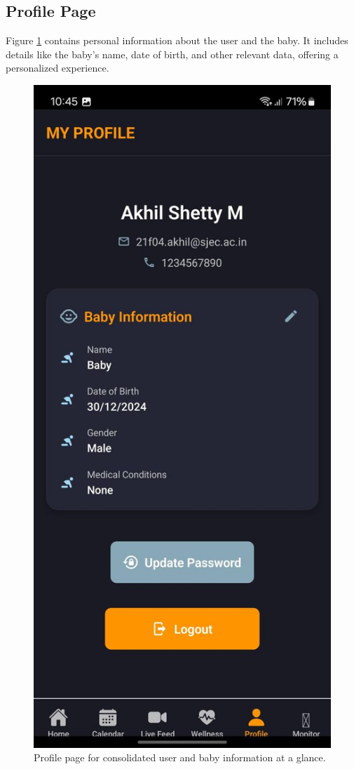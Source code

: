 \documentclass[12pt,a4paper]{report}
\begin{document}
\subsection{Profile Page}
Figure \ref{fig:profile} contains personal information about the user and the baby. It includes details like the baby’s name, date of birth, and other relevant data, offering a personalized experience.
\begin{figure}[htbp]
  \centering
  \includegraphics[scale=0.2]{./pic/profile.jpeg}
  \caption{Profile page for consolidated user and baby information at a glance.}
  \label{fig:profile}
\end{figure}
\end{document}
